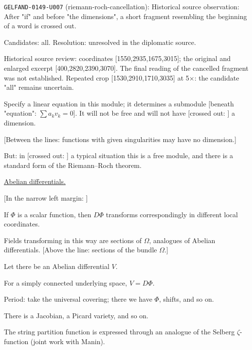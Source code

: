 \noindent\texttt{GELFAND-0149-U007} (riemann-roch-cancellation): Historical source observation: After "if" and before "the dimensions", a short fragment resembling the beginning of a word is crossed out.\par
Candidates: all. Resolution: unresolved in the diplomatic source.\par
Historical source review: coordinates [1550,2935,1675,3015]; the original and enlarged excerpt [400,2820,2390,3070]. The final reading of the cancelled fragment was not established. Repeated crop [1530,2910,1710,3035] at 5×: the candidate "all" remains uncertain.\par



Specify a linear equation in this module; it determines a submodule
[beneath "equation": $\sum a_k v_k=0$].
It will not be free and will not have
[crossed out: ]
a dimension.

[Between the lines: functions with
given
singularities may have no dimension.]

But: in [crossed out: ]
a typical situation this is a free module, and there is a standard form of the Riemann--Roch theorem.

\underline{Abelian differentials.}

[In the narrow left margin: ]

If $\Phi$ is a scalar function, then $D\Phi$ transforms correspondingly in different local coordinates.

Fields transforming in this way are sections of $\Omega$, analogues of Abelian differentials.
[Above the line: sections of the bundle $\Omega$.]

Let there be an Abelian differential $V$.

For a simply connected underlying space, $V=D\Phi$.

Period: take the universal covering; there we have $\Phi$, shifts, and so on.

There is a Jacobian, a Picard variety, and so on.

The string partition function is expressed through an analogue of the Selberg $\zeta$-function
(joint work with Manin).

